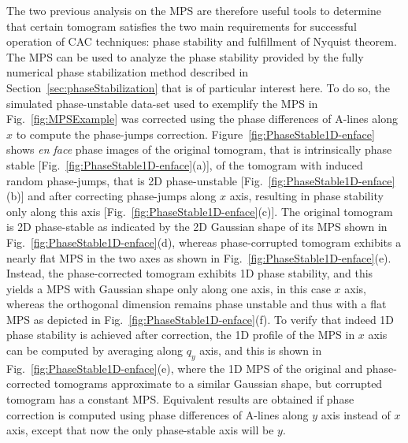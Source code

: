 The two previous analysis on the MPS are therefore useful tools to determine that certain tomogram satisfies the two main requirements for successful operation of CAC techniques: phase stability and fulfillment of Nyquist theorem. The MPS can be used to analyze the phase stability provided by the fully numerical phase stabilization method described in Section~\ref{sec:phaseStabilization} that is of particular interest here. To do so, the simulated phase-unstable data-set used to exemplify the MPS in Fig.~\ref{fig:MPSExample} was corrected using the phase differences of A-lines along $x$ to compute the phase-jumps correction. Figure~\ref{fig:PhaseStable1D-enface} shows \textit{en face} phase images of the original tomogram, that is intrinsically phase stable [Fig.~\ref{fig:PhaseStable1D-enface}(a)], of the tomogram with induced random phase-jumps, that is 2D phase-unstable [Fig.~\ref{fig:PhaseStable1D-enface}(b)] and after correcting phase-jumps along $x$ axis, resulting in phase stability only along this axis [Fig.~\ref{fig:PhaseStable1D-enface}(c)]. The original tomogram is 2D phase-stable as indicated by the 2D Gaussian shape of its MPS shown in Fig.~\ref{fig:PhaseStable1D-enface}(d), whereas phase-corrupted tomogram exhibits a nearly flat MPS in the two axes as shown in Fig.~\ref{fig:PhaseStable1D-enface}(e). Instead, the phase-corrected tomogram exhibits 1D phase stability, and this yields a MPS with Gaussian shape only along one axis, in this case $x$ axis, whereas the orthogonal dimension remains phase unstable and thus with a flat MPS as depicted in Fig.~\ref{fig:PhaseStable1D-enface}(f). To verify that indeed 1D phase stability is achieved after correction, the 1D profile of the MPS in $x$ axis can be computed by averaging along $q_y$ axis, and this is shown in Fig.~\ref{fig:PhaseStable1D-enface}(e), where the 1D MPS of the original and phase-corrected tomograms approximate to a similar Gaussian shape, but corrupted tomogram has a constant MPS. Equivalent results are obtained if phase correction is computed using phase differences of A-lines along $y$ axis instead of $x$ axis, except that now the only phase-stable axis will be $y$.

